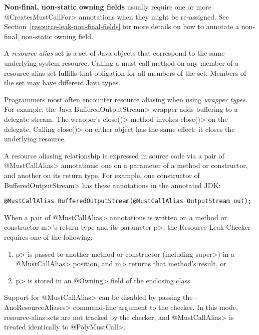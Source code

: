 \textbf{Non-final, non-static owning fields} usually require one or more \<@CreatesMustCallFor> annotations
when they might be re-assigned. See Section~\ref{resource-leak-non-final-fields} for
more details on how to annotate a non-final, non-static owning field.



A \emph{resource alias} set is a set of Java objects that
correspond to the same underlying system resource.
Calling a must-call method on any member of a resource-alias set
fulfills that obligation for all members of the set.
Members of the set may have different Java types.

Programmers most often encounter resource aliasing when using \emph{wrapper types}.
For example, the Java \<Buffered\-Output\-Stream> wrapper adds buffering to a
delegate stream.
The wrapper's \<close()> method invokes \<close()> on the delegate.  Calling
\<close()> on either object has the same effect:  it closes the underlying resource.

A resource aliasing relationship is expressed in source code via a pair of \<@MustCallAlias> annotations:
one on a parameter of a method or constructor, and another on its return type.
For example, one constructor of \<BufferedOutputStream> has these annotations in
the annotated JDK:
\begin{Verbatim}
@MustCallAlias BufferedOutputStream(@MustCallAlias OutputStream out);
\end{Verbatim}

When a pair of \<@MustCallAlias> annotations is written on a method or constructor \<m>'s return type
and its parameter \<p>, the Resource Leak Checker requires one of the following:
\begin{enumerate}
\item \<p> is passed to another method or constructor (including \<super>) in a
  \<@MustCallAlias> position, and \<m> returns that method's result, or
\item \<p> is stored in an \<@Owning> field of the enclosing class.
\end{enumerate}

Support for \<@MustCallAlias> can be disabled by passing the \<-AnoResourceAliases> command-line
argument to the checker. In this mode, resource-alias sets are not tracked by the checker,
and \<@MustCallAlias> is treated identically to \<@PolyMustCall>.



